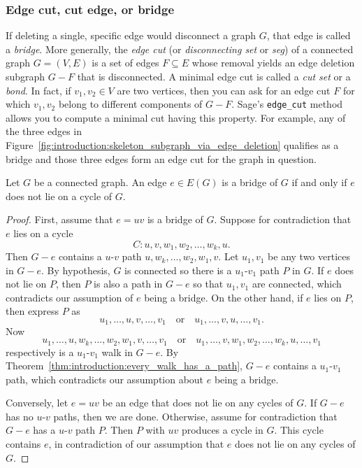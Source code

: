
\subsubsection{Edge cut, cut edge, or bridge}

If deleting a single, specific edge would disconnect a graph $G$, that
edge is called a \emph{bridge}. More generally, the
\emph{edge cut} (or
\emph{disconnecting set} or \emph{seg}) of a
connected graph $G = (V, E)$ is a set of edges $F \subseteq E$ whose
removal yields an edge deletion subgraph $G - F$ that is
disconnected. A minimal edge cut is called a
\emph{cut set} or a \emph{bond}. In fact,
if $v_1, v_2 \in V$ are two vertices, then you can ask for an edge cut
$F$ for which $v_1, v_2$ belong to different components of $G -
F$. Sage's \verb!edge_cut! method allows you to compute a minimal cut
having this property. For example, any of the three edges in
Figure~\ref{fig:introduction:skeleton_subgraph_via_edge_deletion}
qualifies as a bridge and those three edges form an edge cut for the
graph in question.

\begin{theorem}
\label{thm:inroduction:edge_is_bridge_iff_edge_not_on_cycle}
Let $G$ be a connected graph. An edge $e \in E(G)$ is a bridge of $G$
if and only if $e$ does not lie on a cycle of $G$.
\end{theorem}

\begin{proof}
First, assume that $e = uv$ is a bridge of $G$. Suppose for
contradiction that $e$ lies on a cycle
\[
C: u, v, w_1, w_2, \dots, w_k, u.
\]
Then $G - e$ contains a $u$-$v$ path
$u, w_k, \dots, w_2, w_1, v$. Let $u_1, v_1$ be any two vertices in
$G - e$. By hypothesis, $G$ is connected so there is a $u_1$-$v_1$
path $P$ in $G$. If $e$ does not lie on $P$, then $P$ is also a path
in $G - e$ so that $u_1, v_1$ are connected, which contradicts our
assumption of $e$ being a bridge. On the other hand, if $e$ lies on
$P$, then express $P$ as
\[
u_1, \dots, u, v, \dots, v_1
\quad\text{or}\quad
u_1, \dots, v, u, \dots, v_1.
\]
Now
\[
u_1, \dots, u, w_k, \dots, w_2, w_1, v, \dots, v_1
\quad\text{or}\quad
u_1, \dots, v, w_1, w_2, \dots, w_k, u, \dots, v_1
\]
respectively is a $u_1$-$v_1$ walk in $G - e$. By
Theorem~\ref{thm:introduction:every_walk_has_a_path}, $G - e$
contains a $u_1$-$v_1$ path, which contradicts our assumption about
$e$ being a bridge.

Conversely, let $e = uv$ be an edge that does not lie on any cycles of
$G$. If $G - e$ has no $u$-$v$ paths, then we are done. Otherwise,
assume for contradiction that $G - e$ has a $u$-$v$ path $P$. Then $P$
with $uv$ produces a cycle in $G$. This cycle contains $e$, in
contradiction of our assumption that $e$ does not lie on any cycles of
$G$.
\end{proof}


